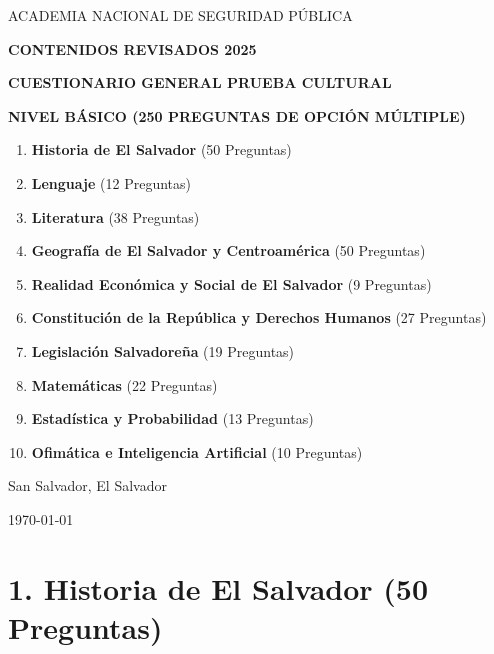 \documentclass[10pt,a4paper]{article}
\begin{document}
\begin{titlepage}
\centering
{\scshape\LARGE ACADEMIA NACIONAL DE SEGURIDAD PÚBLICA \par}
\vspace{0.8cm}
{\Large\bfseries CONTENIDOS REVISADOS 2025 \par}
\vspace{1cm}
{\huge\bfseries CUESTIONARIO GENERAL PRUEBA CULTURAL \par}
{\Large\bfseries NIVEL BÁSICO (250 PREGUNTAS DE OPCIÓN MÚLTIPLE) \par}
\vspace{1.5cm}
\begin{tcolorbox}[colback=blue!5!white,colframe=blue!60!black,title=\textbf{TEMARIO OFICIAL}]
\begin{enumerate}[label=\textbf{\arabic*.}]
  \item \textbf{Historia de El Salvador} (50 Preguntas)
  \item \textbf{Lenguaje} (12 Preguntas)
  \item \textbf{Literatura} (38 Preguntas)
  \item \textbf{Geografía de El Salvador y Centroamérica} (50 Preguntas)
  \item \textbf{Realidad Económica y Social de El Salvador} (9 Preguntas)
  \item \textbf{Constitución de la República y Derechos Humanos} (27 Preguntas)
  \item \textbf{Legislación Salvadoreña} (19 Preguntas)
  \item \textbf{Matemáticas} (22 Preguntas)
  \item \textbf{Estadística y Probabilidad} (13 Preguntas)
  \item \textbf{Ofimática e Inteligencia Artificial} (10 Preguntas)
\end{enumerate}
\end{tcolorbox}
\vfill
{\large San Salvador, El Salvador \par}
{\large \today \par}
\end{titlepage}
\newpage

\section{1. Historia de El Salvador (50 Preguntas)}
\end{document}

